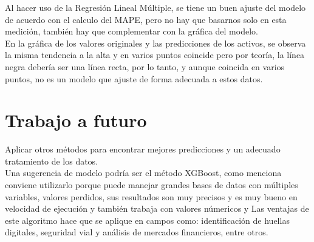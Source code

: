 \documentclass{article}
\begin{document}
Al hacer uso de la Regresión Lineal Múltiple, se tiene un buen ajuste del modelo de acuerdo con el calculo del MAPE, pero no hay que basarnos solo en esta medición, también hay que complementar con la gráfica del modelo.  
\\

En la gráfica de los valores originales y las predicciones de los activos, se observa la misma tendencia a la alta y en varios puntos coincide pero por teoría, la línea negra debería ser una línea recta, por lo tanto, y aunque coincida en varios puntos, no es un modelo que ajuste de forma adecuada a estos datos.


\section{Trabajo a futuro}
Aplicar otros métodos para encontrar mejores predicciones y un adecuado tratamiento de los datos.
\\

Una sugerencia de modelo podría ser el método XGBoost, como menciona \cite{zuñ2020} conviene utilizarlo porque puede manejar grandes bases de datos con múltiples variables, valores perdidos, sus resultados son muy precisos y es muy bueno en velocidad de ejecución y también trabaja con valores númericos y Las ventajas de este algoritmo hace que se aplique en campos como: identificación de huellas digitales, seguridad vial y análisis de mercados financieros, entre otros.




\end{document}
